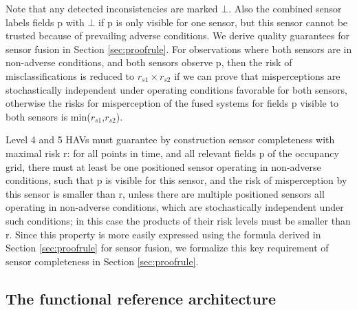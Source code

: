 Note that any detected inconsistencies are marked $\bot$. Also the combined sensor labels fields p with $\bot$ if p is only visible for one sensor, but this sensor cannot be trusted because of prevailing adverse conditions. We derive quality guarantees for sensor fusion in Section \ref{sec:proofrule}. For observations where both sensors are in non-adverse conditions, and both sensors observe p, then the risk of misclassifications is reduced to $r_{s1} \times r_{s2}$ if we can prove that misperceptions are stochastically independent under operating conditions favorable for both sensors, otherwise the risks for misperception of the fused systems for fields p visible to both sensors is min($r_{s1}$,$r_{s2}$).

Level 4 and 5 HAVs must guarantee by construction sensor completeness with maximal risk r: for all points in time, and all relevant fields p of the occupancy grid, there must at least be one positioned sensor operating in non-adverse conditions, such that p is visible for this sensor, and the risk of misperception by this sensor is smaller than r, unless there are multiple positioned sensors all operating in non-adverse conditions, which are stochastically independent under such conditions; in this case the products of their risk levels must be smaller than r. Since this property is more easily expressed using the formula derived in Section \ref{sec:proofrule} for sensor fusion, we formalize this key requirement of sensor completeness in Section \ref{sec:proofrule}.

\subsection{The functional reference architecture}

